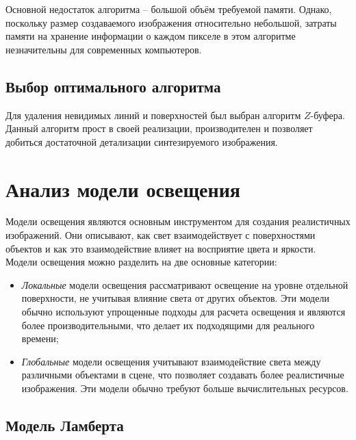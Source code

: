 Основной недостаток алгоритма -- большой объём требуемой памяти. Однако, поскольку размер создаваемого изображения относительно небольшой, затраты памяти на хранение информации о каждом пикселе в этом алгоритме незначительны для современных компьютеров.

\subsection{Выбор оптимального алгоритма}

Для удаления невидимых линий и поверхностей был выбран алгоритм $Z$-буфера. Данный алгоритм прост в своей реализации, производителен и позволяет добиться достаточной детализации синтезируемого изображения.

\section{Анализ модели освещения}

Модели освещения являются основным инструментом для создания реалистичных изображений. Они описывают, как свет взаимодействует с поверхностями объектов и как это взаимодействие влияет на восприятие цвета и яркости. Модели освещения можно разделить на две основные категории:
\begin{itemize}[label=--]
	\item \textit{Локальные} модели освещения рассматривают освещение на уровне отдельной поверхности, не учитывая влияние света от других объектов. Эти модели обычно используют упрощенные подходы для расчета освещения и являются более производительными, что делает их подходящими для реального времени;
	\item \textit{Глобальные} модели освещения учитывают взаимодействие света между различными объектами в сцене, что позволяет создавать более реалистичные изображения. Эти модели обычно требуют больше вычислительных ресурсов.
\end{itemize}

\subsection{Модель Ламберта}

